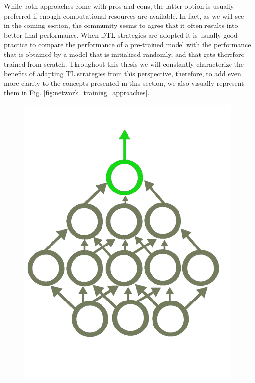 While both approaches come with pros and cons, the latter option is usually preferred if enough computational resources are available. In fact, as we will see in the coming section, the community seems to agree that it often results into better final performance. When DTL strategies are adopted it is usually good practice to compare the performance of a pre-trained model with the performance that is obtained by a model that is initialized randomly, and that gets therefore trained from scratch. Throughout this thesis we will constantly characterize the benefits of adapting TL strategies from this perspective, therefore, to add even more clarity to the concepts presented in this section, we also visually represent them in Fig. \ref{fig:network_training_approaches}. 

\begin{figure}[!htb]
  \includegraphics[width=\linewidth]{./Images/Chapter04/frozen_net.pdf}
\endminipage\hfill
{}

\end{figure}
